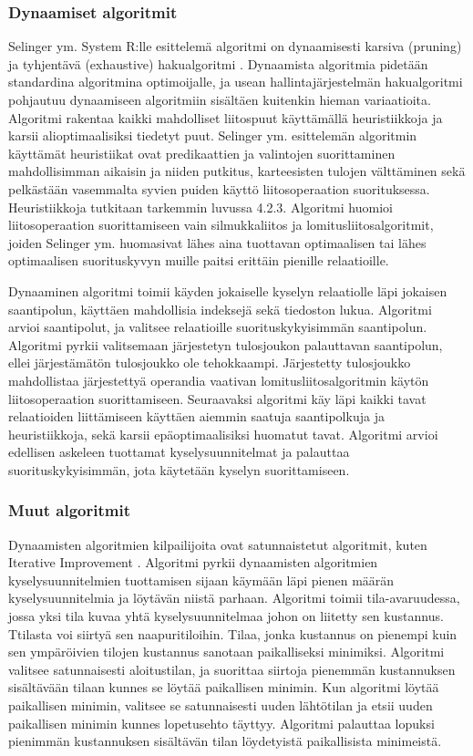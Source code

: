 \documentclass[finnish]{tktltiki2}
\theoremstyle{definition}
\theoremstyle{remark}
\begin{document}
\subsubsection{Dynaamiset algoritmit}
Selinger ym. System R:lle esittelemä algoritmi on dynaamisesti karsiva (pruning) ja tyhjentävä (exhaustive) hakualgoritmi \cite{selinger1979access}. Dynaamista algoritmia pidetään standardina algoritmina optimoijalle, ja usean hallintajärjestelmän hakualgoritmi pohjautuu dynaamiseen algoritmiin sisältäen kuitenkin hieman variaatioita. Algoritmi rakentaa kaikki mahdolliset liitospuut käyttämällä heuristiikkoja ja karsii alioptimaalisiksi tiedetyt puut. Selinger ym. esittelemän algoritmin käyttämät heuristiikat ovat predikaattien ja valintojen suorittaminen mahdollisimman aikaisin ja niiden putkitus, karteesisten tulojen välttäminen sekä pelkästään vasemmalta syvien puiden käyttö liitosoperaation suorituksessa. Heuristiikkoja tutkitaan tarkemmin luvussa 4.2.3. Algoritmi huomioi liitosoperaation suorittamiseen vain silmukkaliitos ja lomitusliitosalgoritmit, joiden Selinger ym. huomasivat lähes aina tuottavan optimaalisen tai lähes optimaalisen suorituskyvyn muille paitsi erittäin pienille relaatioille.

Dynaaminen algoritmi toimii käyden jokaiselle kyselyn relaatiolle läpi jokaisen saantipolun, käyttäen mahdollisia indeksejä sekä tiedoston lukua. Algoritmi arvioi saantipolut, ja valitsee relaatioille suorituskykyisimmän saantipolun. Algoritmi pyrkii valitsemaan järjestetyn tulosjoukon palauttavan saantipolun, ellei järjestämätön tulosjoukko ole tehokkaampi. Järjestetty tulosjoukko mahdollistaa järjestettyä operandia vaativan lomitusliitosalgoritmin käytön liitosoperaation suorittamiseen. Seuraavaksi algoritmi käy läpi kaikki tavat relaatioiden liittämiseen käyttäen aiemmin saatuja saantipolkuja ja heuristiikkoja, sekä karsii epäoptimaalisiksi huomatut tavat. Algoritmi arvioi edellisen askeleen tuottamat kyselysuunnitelmat ja palauttaa suorituskykyisimmän, jota käytetään kyselyn suorittamiseen.
\subsubsection{Muut algoritmit}
Dynaamisten algoritmien kilpailijoita ovat satunnaistetut algoritmit, kuten Iterative Improvement \cite{Swami:1988:OLJ:971701.50203}. Algoritmi pyrkii dynaamisten algoritmien kyselysuunnitelmien tuottamisen sijaan käymään läpi pienen määrän kyselysuunnitelmia ja löytävän niistä parhaan. Algoritmi toimii tila-avaruudessa, jossa yksi tila kuvaa yhtä kyselysuunnitelmaa johon on liitetty sen kustannus. Ttilasta voi siirtyä sen naapuritiloihin. Tilaa, jonka kustannus on pienempi kuin sen ympäröivien tilojen kustannus sanotaan paikalliseksi minimiksi. Algoritmi valitsee satunnaisesti aloitustilan, ja suorittaa siirtoja pienemmän kustannuksen sisältävään tilaan kunnes se löytää paikallisen minimin.  Kun algoritmi löytää paikallisen minimin, valitsee se satunnaisesti uuden lähtötilan ja etsii uuden paikallisen minimin kunnes lopetusehto täyttyy. Algoritmi palauttaa lopuksi pienimmän kustannuksen sisältävän tilan löydetyistä paikallisista minimeistä.
\end{document}
